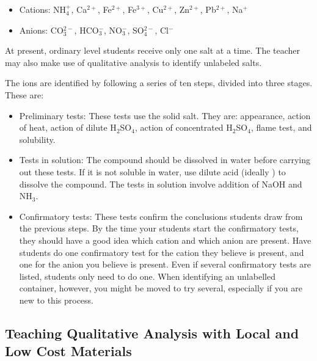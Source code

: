\begin{itemize}
\item{Cations: NH$_{4}^{+}$, 
Ca$^{2+}$, 
Fe$^{2+}$, 
Fe$^{3+}$, 
Cu$^{2+}$, 
Zn$^{2+}$, 
Pb$^{2+}$, 
Na$^{+}$}
\item{Anions: CO$_{3}^{2-}$, 
HCO$_{3}^{-}$, 
NO$_{3}^{-}$, 
SO$_{4}^{2-}$, 
Cl$^{-}$}
\end{itemize}
At present, 
ordinary level students receive only one salt at a time. The teacher may also make use of qualitative analysis to identify unlabeled salts.

The ions are identified by following a series of ten steps, divided into three stages. These are:
\begin{itemize}
\item{Preliminary tests:
These tests use the solid salt. They are: appearance, action of heat, action of dilute H$_{2}$SO$_{4}$, action of concentrated H$_{2}$SO$_{4}$, flame test, and solubility.}
\item{Tests in solution: The compound should be dissolved in water before carrying out these tests. If it is not soluble in water, use dilute acid (ideally ) to dissolve the compound. The tests in solution involve addition of NaOH and NH$_{3}$.}
\item{Confirmatory tests: These tests confirm the conclusions students draw from the previous steps. By the time your students start the confirmatory tests, they should have a good idea which cation and which anion are present. Have students do one confirmatory test for the cation they believe is present, and one for the anion you believe is present. Even if several confirmatory tests are listed, students only need to do one. When identifying an unlabelled container, however, you might be moved to try several, especially if you are new to this process.}
\end{itemize}


\subsection{Teaching Qualitative Analysis with Local and Low Cost Materials}

